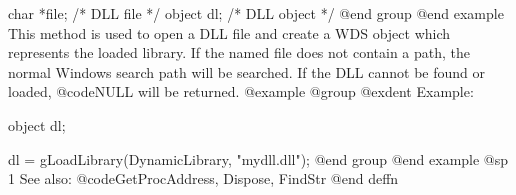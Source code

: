 char    *file;  /*  DLL file    */
object  dl;     /*  DLL object  */
@end group
@end example
This method is used to open a DLL file and create a WDS object which
represents the loaded library.  If the named file does not contain a
path, the normal Windows search path will be searched.  If the
DLL cannot be found or loaded, @code{NULL} will be returned.
@example
@group
@exdent Example:

object  dl;

dl = gLoadLibrary(DynamicLibrary, "mydll.dll");
@end group
@end example
@sp 1
See also:  @code{GetProcAddress, Dispose, FindStr}
@end deffn








